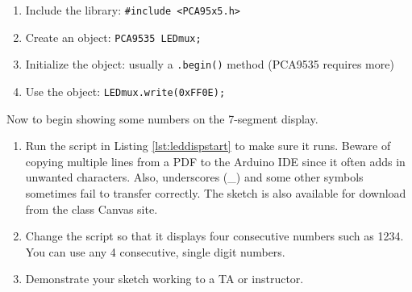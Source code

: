 \begin{enumerate}
    \item Include the library: \lstinline|#include <PCA95x5.h>|
    \item Create an object: \lstinline|PCA9535 LEDmux;|
    \item Initialize the object: usually a \lstinline|.begin()| method (PCA9535 requires more)
    \item Use the object: \lstinline|LEDmux.write(0xFF0E);|
\end{enumerate}

Now to begin showing some numbers on the 7-segment display.

\begin{enumerate}
    \item Run the script in Listing \ref{lst:leddispstart} to make sure it runs. Beware of copying
            multiple lines from a PDF to the Arduino IDE since it often adds in unwanted characters. 
            Also, underscores (\_) and some other symbols sometimes fail to transfer correctly. The 
            sketch is also available for download from the class Canvas site.
    \item Change the script so that it displays four consecutive numbers such as 1234. You can use
            any 4 consecutive, single digit numbers.
    \item Demonstrate your sketch working to a TA or instructor.
\end{enumerate}

